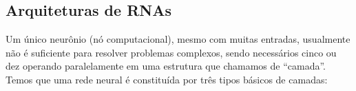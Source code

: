 \documentclass{automatextcc}
\begin{document}
\subsection{Arquiteturas de RNAs}


Um único neurônio (nó computacional), mesmo com muitas entradas, usualmente não é suficiente para resolver problemas complexos, sendo necessários cinco ou dez operando paralelamente em uma estrutura que chamamos de ``camada''. Temos que uma rede neural é constituída por três tipos básicos de camadas:
\end{document}
